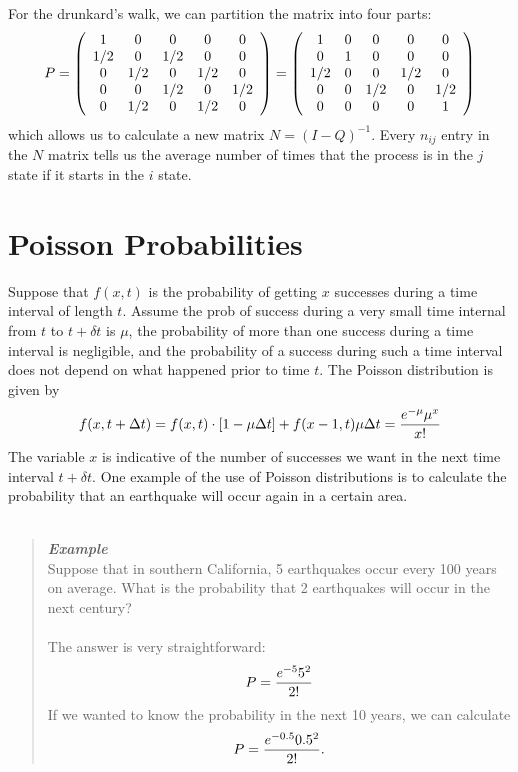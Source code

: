 \documentclass{hw}
\begin{document}
For the drunkard's walk, we can partition the matrix into four parts:
\[
P=
\left(
\begin{array}{c c c c c}
1 & 0 & 0 & 0 & 0\\
1/2 & 0 & 1/2 & 0 & 0\\
0 & 1/2 & 0 & 1/2 & 0\\
0 & 0 & 1/2 & 0 & 1/2\\
0 & 1/2 & 0 & 1/2 & 0
\end{array}
\right)
=
\left(
\begin{array}{c c c c c}
1 & 0 & 0 & 0 & 0\\
0 & 1 & 0 & 0 & 0\\
1/2 & 0 & 0 & 1/2 & 0\\
0 & 0 & 1/2 & 0 & 1/2\\
0 & 0 & 0 & 0 & 1
\end{array}
\right)
\]
which allows us to calculate a new matrix $N=(I-Q)^{-1}$. Every $n_{ij}$ entry in the $N$ matrix
tells us the average number of times that the process is in the $j$ state if it starts in the $i$
state.

\section*{Poisson Probabilities}

Suppose that $f(x,t)$ is the probability of getting $x$ successes during a time interval of length
$t$. Assume the prob of success during a very small time internal from $t$ to $t+\delta t$ is $\mu$,
the probability of more than one success during a time interval is negligible, and the probability
of a success during such a time interval does not depend on what happened prior to time $t$. The
Poisson distribution is given by
\[
f(x,t+\Delta t)=f(x,t)\cdot[1-\mu\Delta t]+f(x-1,t)\mu\Delta t = {e^{-\mu}\mu^{x}\over x!}
\]
The variable $x$ is indicative of the number of successes we want in the next time interval
$t+\delta t$. One example of the use of Poisson distributions is to calculate the probability that
an earthquake will occur again in a certain area.\\\\

\begin{quote}
\textit{\textbf{Example}}\\
Suppose that in southern California, 5 earthquakes occur every 100 years on average. What is the
probability that 2 earthquakes will occur in the next century?\\\\

The answer is very straightforward:
\[
P={e^{-5}5^{2}\over 2!}
\]
If we wanted to know the probability in the next 10 years, we can calculate
\[
P={e^{-0.5}0.5^{2}\over 2!}.
\]
\end{quote}
\end{document}
